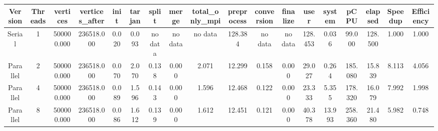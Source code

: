 \begin{tabular}{|c|c|c|c|c|c|c|c|c|c|c|c|c|c|c|c|c|c|}
\toprule
 Version &  Threads &   vertices &  vertices\_after &  init &  tarjan &   split &   merge & total\_only\_mpi &  preprocess & conversion & finalize &    user &  system &    pCPU &  elapsed &  Speedup &  Efficiency \\
\midrule
  Serial &        1 & 500000.000 &      236518.000 & 0.020 &   0.093 & no data & no data &        no data &     128.384 &    no data &  no data & 128.453 &   0.036 &  99.000 &  128.500 &    1.000 &       1.000 \\
Parallel &        2 & 500000.000 &      236518.000 & 0.070 &   2.070 &   0.138 &   0.000 &          2.071 &      12.299 &      0.158 &    0.000 &  29.027 &   0.264 & 185.080 &   15.839 &    8.113 &       4.056 \\
Parallel &        4 & 500000.000 &      236518.000 & 0.089 &   1.596 &   0.143 &   0.000 &          1.596 &      12.468 &      0.122 &    0.000 &  23.333 &   5.355 & 178.320 &   16.079 &    7.992 &       1.998 \\
Parallel &        8 & 500000.000 &      236518.000 & 0.086 &   1.612 &   0.139 &   0.000 &          1.612 &      12.451 &      0.121 &    0.000 &  40.378 &  13.993 & 258.360 &   21.480 &    5.982 &       0.748 \\
\bottomrule
\end{tabular}
